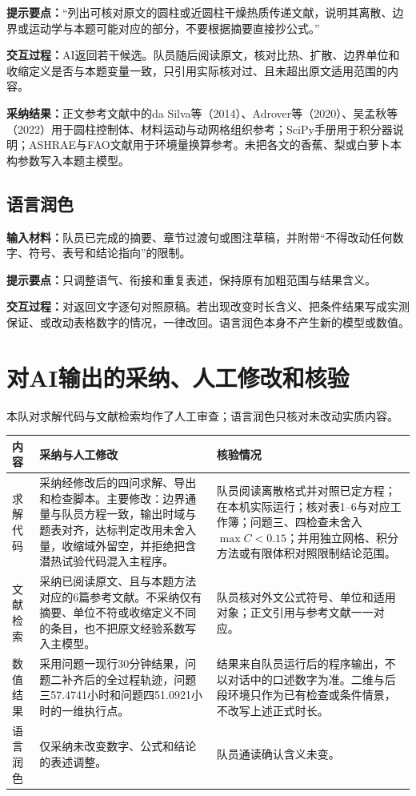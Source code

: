 \documentclass[UTF8,a4paper,zihao=5,fontset=windows]{ctexart}
\begin{document}
\textbf{提示要点：}“列出可核对原文的圆柱或近圆柱干燥热质传递文献，说明其离散、边界或运动学与本题可能对应的部分，不要根据摘要直接抄公式。”

\textbf{交互过程：}AI返回若干候选。队员随后阅读原文，核对比热、扩散、边界单位和收缩定义是否与本题变量一致，只引用实际核对过、且未超出原文适用范围的内容。

\textbf{采纳结果：}正文参考文献中的da Silva等（2014）、Adrover等（2020）、吴孟秋等（2022）用于圆柱控制体、材料运动与动网格组织参考；SciPy手册用于积分器说明；ASHRAE与FAO文献用于环境量换算参考。未把各文的香蕉、梨或白萝卜本构参数写入本题主模型。

\subsection{语言润色}
\textbf{输入材料：}队员已完成的摘要、章节过渡句或图注草稿，并附带“不得改动任何数字、符号、表号和结论指向”的限制。

\textbf{提示要点：}只调整语气、衔接和重复表述，保持原有加粗范围与结果含义。

\textbf{交互过程：}对返回文字逐句对照原稿。若出现改变时长含义、把条件结果写成实测保证、或改动表格数字的情况，一律改回。语言润色本身不产生新的模型或数值。

\section{对AI输出的采纳、人工修改和核验}
本队对求解代码与文献检索均作了人工审查；语言润色只核对未改动实质内容。

\noindent
\begin{tabular}{@{}L{.16\linewidth}L{.42\linewidth}L{.35\linewidth}@{}}
\toprule
内容 & 采纳与人工修改 & 核验情况 \\\midrule
求解代码 &
采纳经修改后的四问求解、导出和检查脚本。主要修改：边界通量与队员方程一致，输出时域与题表对齐，达标判定改用未舍入量，收缩域外留空，并拒绝把含潜热试验代码混入主程序。&
队员阅读离散格式并对照已定方程；在本机实际运行；核对表1--6与对应工作簿；问题三、四检查未舍入$\max C<0.15$；并用独立网格、积分方法或有限体积对照限制结论范围。\\
文献检索 &
采纳已阅读原文、且与本题方法对应的6篇参考文献。不采纳仅有摘要、单位不符或收缩定义不同的条目，也不把原文经验系数写入主模型。&
队员核对外文公式符号、单位和适用对象；正文引用与参考文献一一对应。\\
数值结果 &
采用问题一现行30分钟结果，问题二补齐后的全过程轨迹，问题三57.4741小时和问题四51.0921小时的一维执行点。&
结果来自队员运行后的程序输出，不以对话中的口述数字为准。二维与后段环境只作为已有检查或条件情景，不改写上述正式时长。\\
语言润色 &
仅采纳未改变数字、公式和结论的表述调整。&
队员通读确认含义未变。\\
\bottomrule
\end{tabular}
\end{document}
